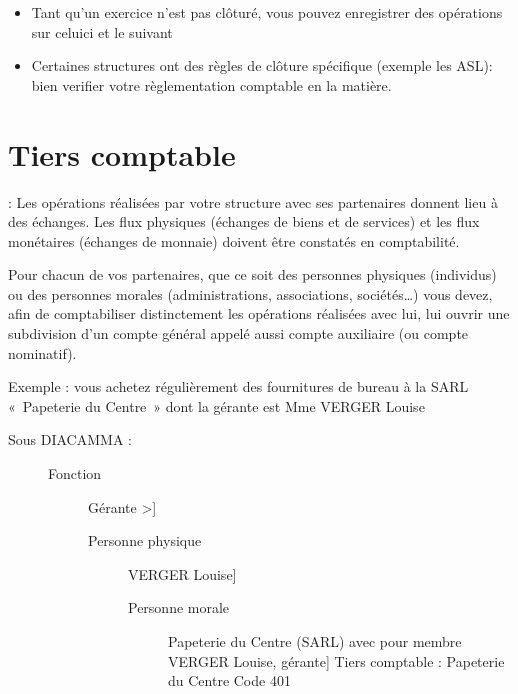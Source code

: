 \documentclass[a4paper,10pt,oneside,french]{sphinxmanual}
\begin{document}
\begin{itemize}
\item {} 
Tant qu’un exercice n’est pas clôturé, vous pouvez enregistrer des opérations sur celui\sphinxhyphen{}ci et le suivant

\item {} 
Certaines structures ont des règles de clôture spécifique (exemple les ASL): bien verifier votre règlementation comptable en la matière.

\end{itemize}


\section{Tiers comptable}
\label{\detokenize{accounting/third:tiers-comptable}}\label{\detokenize{accounting/third::doc}}
 :
Les opérations réalisées par votre structure avec ses partenaires donnent lieu à des échanges. Les flux physiques (échanges de biens et de services) et les flux monétaires (échanges de monnaie) doivent être constatés en comptabilité.

Pour chacun de vos partenaires, que ce soit des personnes physiques (individus) ou des personnes morales (administrations, associations, sociétés…) vous devez, afin de comptabiliser distinctement les opérations réalisées avec lui, lui ouvrir une subdivision d’un compte général appelé aussi compte auxiliaire (ou compte nominatif).

Exemple : vous achetez régulièrement des fournitures de bureau à la SARL « Papeterie du Centre » dont la gérante est Mme VERGER Louise
\begin{description}
\item[{Sous DIACAMMA :}] \leavevmode\begin{description}
\item[{Fonction}] \leavevmode{[}Gérante                                  \textendash{}\textgreater{}{]}\begin{description}
\item[{Personne physique}] \leavevmode{[}VERGER Louise{]}\begin{description}
\item[{Personne morale}] \leavevmode{[}Papeterie du Centre (SARL) avec pour membre VERGER Louise, gérante{]}
Tiers comptable : Papeterie du Centre \sphinxhyphen{} Code 401

\end{description}

\end{description}

\end{description}

\end{description}
\end{document}
